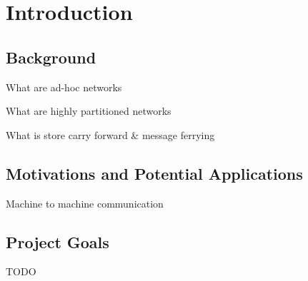 \chapter{Introduction} 

\section{Background}

What are ad-hoc networks

What are highly partitioned networks

What is store carry forward \& message ferrying

\section{Motivations and Potential Applications}

Machine to machine communication

\section{Project Goals}

TODO